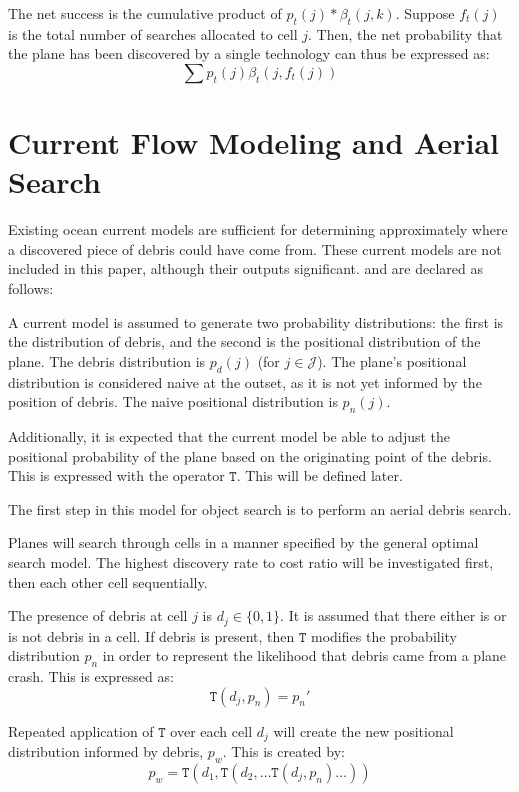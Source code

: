 \documentclass[a4paper]{article}
\begin{document}
The net success is the cumulative product of $p_t(j)*\beta_t(j,k)$. Suppose $f_t(j)$ is the total number of searches allocated to cell $j$. Then, the net probability that the plane has been discovered by a single technology can thus be expressed as: $$\sum p_t(j)\beta_t(j,f_t(j))$$



\section{Current Flow Modeling and Aerial Search}

Existing ocean current models are sufficient for determining approximately where a discovered piece of debris could have come from. These current models are not included in this paper, although their outputs significant. and are declared as follows:

A current model is assumed to generate two probability distributions: the first is the distribution of debris, and the second is the positional distribution of the plane. The debris distribution is $p_d(j)$ (for $j\in\mathcal{J}$). The plane's positional distribution is considered naive at the outset, as it is not yet informed by the position of debris. The naive positional distribution is $p_n(j)$. 

Additionally, it is expected that the current model be able to adjust the positional probability of the plane based on the originating point of the debris. This is expressed with the operator $\mathtt{T}$. This will be defined later. 

The first step in this model for object search is to perform an aerial debris search. 

Planes will search through cells in a manner specified by the general optimal search model. The highest discovery rate to cost ratio will be investigated first, then each other cell sequentially.

The presence of debris at cell $j$ is $d_j\in \{0,1\}$. It is assumed that there either is or is not debris in a cell. If debris is present, then $\mathtt{T}$ modifies the probability distribution $p_n$ in order to represent the likelihood that debris came from a plane crash. This is expressed as: $$\mathtt{T}(d_j,p_n)=p_n'$$

Repeated application of $\mathtt{T}$ over each cell $d_j$ will create the new positional distribution informed by debris, $p_w$. This is created by: $$p_w=\mathtt{T}(d_1, \mathtt{T}(d_2, \ldots \mathtt{T}(d_j, p_n)\ldots))$$
\end{document}
